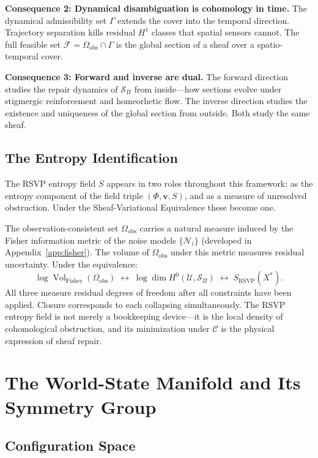 \documentclass[12pt, oneside]{article}
\DeclareMathOperator{\vol}{Vol}
\begin{document}
\textbf{Consequence 2: Dynamical disambiguation is cohomology in time.} The dynamical
admissibility set $\Gamma$ extends the cover into the temporal direction. Trajectory
separation kills residual $H^1$ classes that spatial sensors cannot. The full feasible set
$\mathcal{F} = \Omega_{\mathrm{obs}} \cap \Gamma$ is the global section of a sheaf over a
spatio-temporal cover.

\textbf{Consequence 3: Forward and inverse are dual.} The forward direction studies the
repair dynamics of $\mathcal{S}_\Pi$ from inside---how sections evolve under stigmergic
reinforcement and homeorhetic flow. The inverse direction studies the existence and
uniqueness of the global section from outside. Both study the same sheaf.

\subsection{The Entropy Identification}

The RSVP entropy field $S$ appears in two roles throughout this framework: as the
entropy component of the field triple $(\Phi, \mathbf{v}, S)$, and as a measure of
unresolved obstruction. Under the Sheaf-Variational Equivalence these become one.

The observation-consistent set $\Omega_{\mathrm{obs}}$ carries a natural measure induced
by the Fisher information metric of the noise models $\{\mathcal{N}_i\}$ (developed in
Appendix~\ref{app:fisher}). The volume of $\Omega_{\mathrm{obs}}$ under this metric
measures residual uncertainty. Under the equivalence:
\[
\log \vol_{\mathrm{Fisher}}(\Omega_{\mathrm{obs}})
\;\longleftrightarrow\;
\log \dim H^0(\mathcal{U}, \mathcal{S}_\Pi)
\;\longleftrightarrow\;
S_{\mathrm{RSVP}}(X^*).
\]
All three measure residual degrees of freedom after all constraints have been applied.
Closure corresponds to each collapsing simultaneously. The RSVP entropy field is not
merely a bookkeeping device---it is the local density of cohomological obstruction, and
its minimization under $\mathcal{C}$ is the physical expression of sheaf repair.

\section{The World-State Manifold and Its Symmetry Group}
\label{sec:worldstate}

\subsection{Configuration Space}
\end{document}
